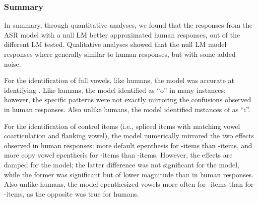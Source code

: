 {%

\subsubsection{Summary}
In summary, through quantitative analyses, we found that the responses from the ASR model with a null LM better approximated human responses, out of the different LM tested. Qualitative analyses showed that the null LM model responses where generally similar to human responses, but with some added noise.

For the identification of full vowels, like humans, the model was accurate at identifying . Like humans, the model identified  as ``o'' in many instances; however, the specific patterns were not exactly mirroring the confusions observed in human responses. Also unlike humans, the model identified instances of  as ``i''.

For the identification of control items (i.e., spliced items with matching vowel coarticulation and flanking vowel), the model numerically mirrored the two effects observed in human responses: more default  epenthesis for -items than -items, and more copy vowel epenthesis for -items than -items. However, the effects are damped for the model; the latter difference was not significant for the model, while the former was significant but of lower magnitude than in human responses. Also unlike humans, the model epenthesized vowels more often for -items than for -items, as the opposite was true for humans. 

}
